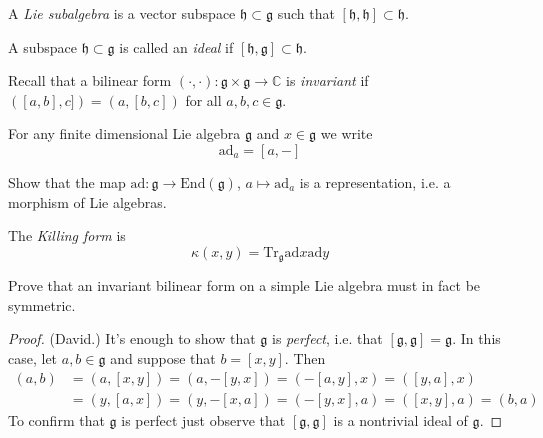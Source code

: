 \begin{definition}
\label{definition-Lie-subalgebra}
A {\it Lie subalgebra} is a vector
subspace $\mathfrak{h} \subset \mathfrak{g}$
such that $[\mathfrak{h},\mathfrak{h}]
\subset \mathfrak{h}$.
\end{definition}

\begin{definition}
\label{definition-ideal}
A subspace $\mathfrak{h}\subset \mathfrak{g}$
is called an
{\it ideal} if
$[\mathfrak{h},\mathfrak{g}]
\subset\mathfrak{h}$.
\end{definition}

\medskip\noindent
Recall that a bilinear form
$(\cdot,\cdot):\mathfrak{g}\times\mathfrak{g}
\to
\mathbb{C}$ is {\it invariant}
if $([a,b],c])=(a,[b,c])$ for all  $a,b,c \in
\mathfrak{g}$.

\begin{definition}
\label{definition-ad}
For any finite dimensional Lie algebra
$\mathfrak{g}$
and $x \in \mathfrak{g}$
we write
$$
\text{ad}_a=[a,-]
$$
\end{definition}

\begin{exercise}
\label{exercise-adjoint-representation}
Show that the map $\text{ad}:\mathfrak{g}\to
\text{End}(\mathfrak{g})$,
$a \mapsto \text{ad}_a$ is a representation,
i.e. a morphism of Lie algebras.
\end{exercise}

\begin{definition}
\label{definition-Killing-form}
The {\it Killing form} is
$$
\kappa(x,y)=\text{Tr}_{\mathfrak{g}}\text{ad}
x\text{ad}y
$$
\end{definition}

\begin{exercise}
\label{exercise-invar-bilin-form-simpl}
Prove that an invariant bilinear form on a
simple Lie algebra must in fact be
symmetric.
\end{exercise}

\begin{proof}
(David.) It's enough to show that
$\mathfrak{g}$ is
{\it perfect}, i.e. that
$[\mathfrak{g},\mathfrak{g}]=\mathfrak{g}$.
In this
case, let $a,b \in \mathfrak{g}$ and suppose
that $b=[x,y]$. Then
$$
\begin{aligned}
(a,b)&=(a,[x,y])=(a,-[y,x])=(-[a,y],x)=([y,a]
,x)\\
&=(y,[a,x])=(y,-[x,a])=(-[y,x],a)=([x,y],a)=
(b,a)
\end{aligned}
$$
To confirm that $\mathfrak{g}$ is perfect
just observe that
$[\mathfrak{g},\mathfrak{g}]$ is a nontrivial
ideal of $\mathfrak{g}$.
\end{proof}

